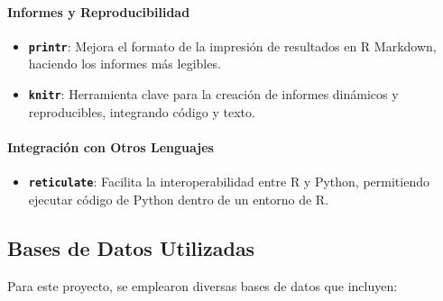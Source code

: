 \documentclass[
  12pt,
]{book}
\providecommand{\tightlist}{%
  \setlength{\itemsep}{0pt}\setlength{\parskip}{0pt}}
\begin{document}
\hypertarget{informes-y-reproducibilidad}{%
\paragraph*{Informes y Reproducibilidad}\label{informes-y-reproducibilidad}}

\begin{itemize}
\tightlist
\item
  \textbf{\texttt{printr}}: Mejora el formato de la impresión de resultados en R Markdown, haciendo los informes más legibles.
\item
  \textbf{\texttt{knitr}}: Herramienta clave para la creación de informes dinámicos y reproducibles, integrando código y texto.
\end{itemize}

\hypertarget{integraciuxf3n-con-otros-lenguajes}{%
\paragraph*{Integración con Otros Lenguajes}\label{integraciuxf3n-con-otros-lenguajes}}

\begin{itemize}
\tightlist
\item
  \textbf{\texttt{reticulate}}: Facilita la interoperabilidad entre R y Python, permitiendo ejecutar código de Python dentro de un entorno de R.
\end{itemize}

\hypertarget{bases-de-datos-utilizadas}{%
\subsection*{Bases de Datos Utilizadas}\label{bases-de-datos-utilizadas}}

Para este proyecto, se emplearon diversas bases de datos que incluyen:
\end{document}
